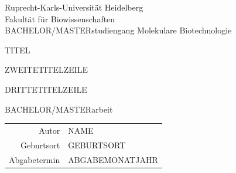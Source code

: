 \documentclass[parskip, twoside]{scrreprt}			%
\newcommand{\workauthor}{NAME}
\newcommand{\worktitle}{TITEL}
\newcommand{\worksubtitle}{ZWEITETITELZEILE}		%
\newcommand{\worksubsubtitle}{DRITTETITELZEILE}
\newcommand{\birthplace}{GEBURTSORT}
\newcommand{\submissiondate}{ABGABEMONATJAHR}
\newcommand{\degree}{BACHELOR/MASTER}				%
\newcommand{\worktype}{\degree{}arbeit}				%
\begin{document}
\begin{titlepage}
	\centering
	{\Large Ruprecht-Karls-Universität Heidelberg\\
		Fakultät für Biowissenschaften\\
		\degree{}studiengang Molekulare Biotechnologie\\}

	{}
	{

		{\Huge \worktitle{}}

		{\Huge \worksubtitle{}}

		{\Huge \worksubsubtitle{}}

	}

	{\Large \worktype{}}


	{\Large
		\begin{tabular}{rl}
			Autor &\workauthor{}\\
			Geburtsort &\birthplace{}\\
			Abgabetermin &\submissiondate{}\\
		\end{tabular}
	}


\end{titlepage}
\pagestyle{plain.scrheadings}		%




\tableofcontents









\appendix



\printbibliography
\end{document}
